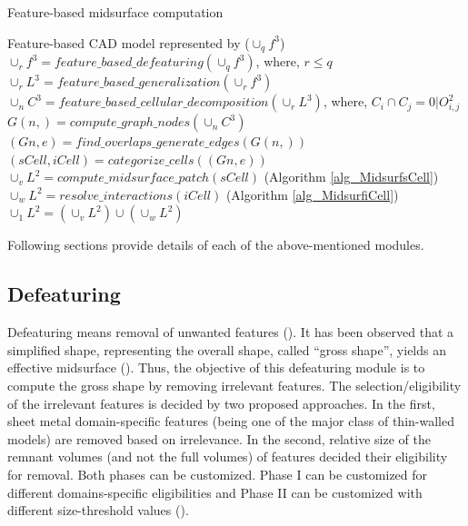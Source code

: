 \begin{algorithm}[!h]
\caption{Feature-based midsurface computation}
\label{alg_FBDMidsurf}
\begin{algorithmic}
	\REQUIRE Feature-based CAD model  represented by  ($\cup_qf^3$)
	\STATE $\cup_rf^3 = feature\_based\_defeaturing(\cup_qf^3)$, where, $r \leq q$
	\STATE $\cup_rL^3 = feature\_based\_generalization(\cup_rf^3 )$
	\STATE $\cup_nC^3 =feature\_based\_cellular\_decomposition(\cup_rL^3)$, where, $C_i \cap C_j = 0| O_{i,j}^2$
	\STATE $G(n, ) = compute\_graph\_nodes(\cup_nC^3)$
	\STATE $(Gn,e) = find\_overlaps\_generate\_edges(G(n, ))$
	\STATE $(sCell,iCell) = categorize\_cells((Gn,e))$
		\STATE $\cup_vL^2 = compute\_midsurface\_patch(sCell)$ (Algorithm \ref{alg_MidsurfsCell})
	\ENDFOR
		\STATE $\cup_wL^2 = resolve\_interactions(iCell)$ (Algorithm \ref{alg_MidsurfiCell})
	\ENDFOR
	\RETURN $\cup_1L^2 = (\cup_vL^2) \cup (\cup_wL^2)$

\end{algorithmic}
\end{algorithm}

\bigskip

Following sections provide details of each of the above-mentioned modules.

\subsection{Defeaturing} \label{sec:defeaturing}
Defeaturing means removal of unwanted features (\cite{Thakur2009}). It has been observed that a simplified shape, representing the overall shape, called ``gross shape'', yields an effective midsurface (\cite{YogeshCADConf2015}). Thus, the objective of this defeaturing module is to compute the gross shape by removing irrelevant features. The selection/eligibility of the irrelevant features is decided by two proposed approaches. In the first, sheet metal domain-specific features (being one of the major class of thin-walled models) are removed based on irrelevance. In the second, relative size of the remnant volumes (and not the full volumes) of features decided their eligibility for removal. Both phases can be customized. Phase I can be customized for different domains-specific eligibilities and Phase II can be customized with different size-threshold values (\cite{YogeshCADConf2015}).

